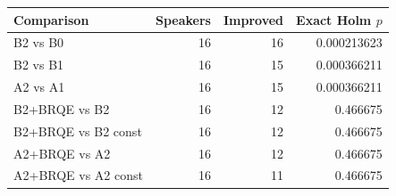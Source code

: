 \begin{tabular}{lrrr}
\toprule
Comparison & Speakers & Improved & Exact Holm $p$ \\
\midrule
B2 vs B0 & 16 & 16 & 0.000213623 \\
B2 vs B1 & 16 & 15 & 0.000366211 \\
A2 vs A1 & 16 & 15 & 0.000366211 \\
B2+BRQE vs B2 & 16 & 12 & 0.466675 \\
B2+BRQE vs B2 const & 16 & 12 & 0.466675 \\
A2+BRQE vs A2 & 16 & 12 & 0.466675 \\
A2+BRQE vs A2 const & 16 & 11 & 0.466675 \\
\bottomrule
\end{tabular}
